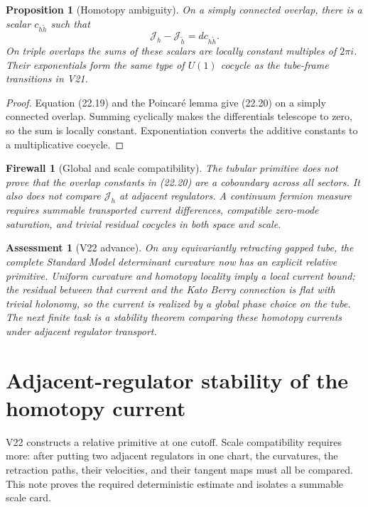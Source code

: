 \documentclass[11pt]{article}
\newtheorem{proposition}[theorem]{Proposition}
\newtheorem{assessment}[theorem]{Assessment}
\newtheorem{firewall}[theorem]{Firewall}
\begin{document}
\begin{proposition}[Homotopy ambiguity]
\label{prop:v11v22-ambiguity}
On a simply connected overlap, there is a scalar
\(c_{h\widetilde h}\) such that
\[
 \mathcal J_h-\mathcal J_{\widetilde h}
 =
 dc_{h\widetilde h}.
 \tag{22.20}
\]
On triple overlaps the sums of these scalars are locally constant
multiples of \(2\pi i\).  Their exponentials form the same type of
\(U(1)\) cocycle as the tube-frame transitions in V21.
\end{proposition}

\begin{proof}
Equation (22.19) and the Poincar\'e lemma give (22.20) on a simply
connected overlap.  Summing cyclically makes the differentials telescope
to zero, so the sum is locally constant.  Exponentiation converts the
additive constants to a multiplicative cocycle.
\end{proof}

\begin{firewall}[Global and scale compatibility]
\label{fw:v11v22-global}
The tubular primitive does not prove that the overlap constants in
(22.20) are a coboundary across all sectors.  It also does not compare
\(\mathcal J_h\) at adjacent regulators.  A continuum fermion measure
requires summable transported current differences, compatible
zero-mode saturation, and trivial residual cocycles in both space and
scale.
\end{firewall}

\begin{assessment}[V22 advance]
\label{ass:v11v22}
On any equivariantly retracting gapped tube, the complete Standard Model
determinant curvature now has an explicit relative primitive.  Uniform
curvature and homotopy locality imply a local current bound; the residual
between that current and the Kato Berry connection is flat with trivial
holonomy, so the current is realized by a global phase choice on the
tube.  The next finite task is a stability theorem comparing these
homotopy currents under adjacent regulator transport.
\end{assessment}
\section{Adjacent-regulator stability of the homotopy current}
\label{sec:v11v23}

V22 constructs a relative primitive at one cutoff.  Scale compatibility
requires more: after putting two adjacent regulators in one chart, the
curvatures, the retraction paths, their velocities, and their tangent
maps must all be compared.  This note proves the required deterministic
estimate and isolates a summable scale card.
\end{document}
